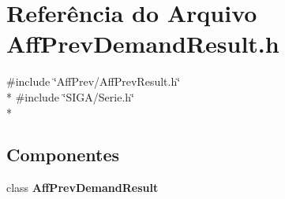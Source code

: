 \section{Referência do Arquivo Aff\+Prev\+Demand\+Result.\+h}
\label{_aff_prev_demand_result_8h}
{\ttfamily \#include \char`\"{}Aff\+Prev/\+Aff\+Prev\+Result.\+h\char`\"{}}\\*
{\ttfamily \#include \char`\"{}S\+I\+G\+A/\+Serie.\+h\char`\"{}}\\*
\subsection*{Componentes}
\begin{DoxyCompactItemize}
\item 
class {\bf Aff\+Prev\+Demand\+Result}
\end{DoxyCompactItemize}
